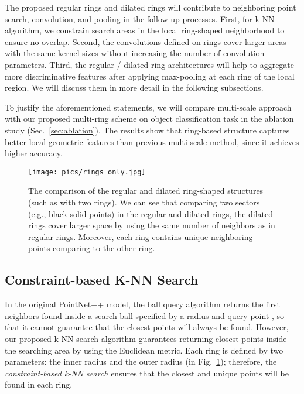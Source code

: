 \documentclass[10pt,twocolumn,letterpaper]{article}
\begin{document}
The proposed regular rings and dilated rings will contribute to neighboring point search, convolution, and pooling in the follow-up processes. First, for k-NN algorithm, we constrain search areas in the local ring-shaped neighborhood to ensure no overlap. Second, the convolutions defined on rings cover larger areas with the same kernel sizes without increasing the number of convolution parameters. Third, the regular / dilated ring architectures will help to aggregate more discriminative features after applying max-pooling at each ring of the local region. We will discuss them in more detail in the following subsections.

To justify the aforementioned statements, we will compare multi-scale approach with our proposed multi-ring scheme on object classification task in the ablation study (Sec.~\ref{sec:ablation}). The results show that ring-based structure captures better local geometric features than previous multi-scale method, since it achieves higher accuracy.
\begin{figure}[t]
\begin{center}
  \texttt{[image: pics/rings\_only.jpg]}\vspace{-4mm}
\end{center}
\caption{The comparison of the regular and dilated ring-shaped structures (such as with two rings). We can see that comparing two sectors (e.g., black solid points) in the regular and dilated rings, the dilated rings cover larger space by using the same number of neighbors as in regular rings. Moreover, each ring contains unique neighboring points comparing to the other ring.
}\vspace{-5mm}
\centering
\label{fig:dilated_rings}
\end{figure}

\subsection{Constraint-based K-NN Search}
In the original PointNet++ model, the ball query algorithm returns the first  neighbors found inside a search ball specified by a radius  and query point , so that it cannot guarantee that the closest points will always be found. However, our proposed k-NN search algorithm guarantees returning closest points inside the searching area by using the Euclidean metric. Each ring is defined by two parameters: the inner radius  and the outer radius  (in Fig.~\ref{fig:dilated_rings}); therefore, the \emph{constraint-based k-NN search} ensures that the closest and unique points will be found in each ring.
\vspace{-2mm}
\end{document}
